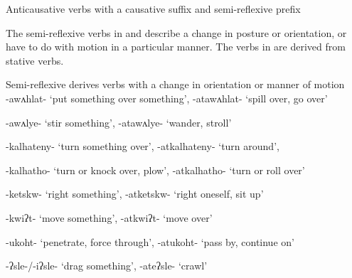 \documentclass[output=paper]{langscibook}
\begin{document}
\ea%
    Anticausative verbs with a causative suffix and semi-reflexive prefix\label{ex:oneida:19}\\
\z

 The semi-reflexive verbs in  and  describe a change in posture or orientation, or have to do with motion in a particular manner. The verbs in  are derived from stative verbs.

\ea%
    \label{ex:oneida:20}
   Semi-reflexive derives verbs with a change in orientation or manner of motion\\
   {{}-awʌhlat-} ‘put something over something’, {{}-atawʌhlat-} ‘spill over, go over’

    {-awʌlye-} ‘stir something’, {-atawʌlye-} ‘wander, stroll’

    {{}-kalhateny-} ‘turn something over’, {-atkalhateny-} ‘turn around’, 

    {{}-kalhatho-} ‘turn or knock over, plow’, {{}-atkalhatho-} ‘turn or roll over’

    {{}-ketskw-} ‘right something’, {-atketskw-} ‘right oneself, sit up’ 

    {-kwiʔt-} ‘move something’, {-atkwiʔt-} ‘move over’

    {{}-ukoht-} ‘penetrate, force through’, {{}-atukoht-} ‘pass by, continue on’

    {{}-ʔsle-/-iʔsle-} ‘drag something’, {{}-ateʔsle-} ‘crawl’
    \z
\end{document}
